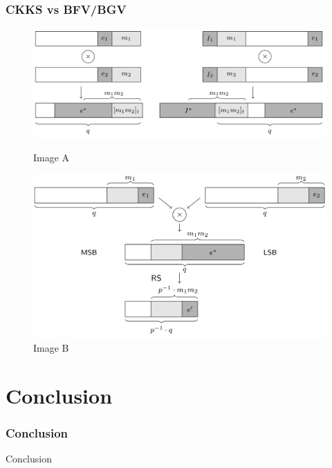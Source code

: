 \documentclass[10pt,handout]{beamer}
\begin{document}
\begin{frame}
    \frametitle{CKKS vs BFV/BGV}
    \begin{figure}
        \begin{minipage}[c]{0.49\linewidth}
            \includegraphics[width=\linewidth]{encoding.png}
            \caption{Image A}
        \end{minipage}
        \hfill
        \begin{minipage}[c]{0.49\linewidth}
            \includegraphics[width=\linewidth]{encoding-ckks.png}
            \caption{Image B}
        \end{minipage}%
    \end{figure}
\end{frame}
\section{Conclusion}
\begin{frame}
    \frametitle{Conclusion}
    Conclusion
\end{frame}

\begin{frame}[noframenumbering]
\frametitle{}

\end{frame}
\end{document}
